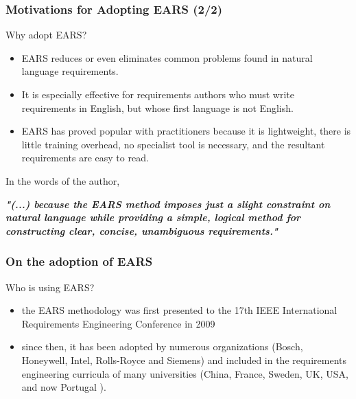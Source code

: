\documentclass[aspectratio=169]{beamer}
\begin{document}
%
\begin{frame}
  \frametitle{Motivations for Adopting EARS (2/2)}
  \begin{block}{Why adopt EARS?}
  \begin{itemize}
    \item EARS reduces or even eliminates common problems found in natural language requirements. 
    \item It is especially effective for requirements authors who must write requirements in English, but whose first language is not English. 
    \item EARS has proved popular with practitioners because it is lightweight, there is little training overhead, no specialist tool is necessary, and the resultant requirements are easy to read.
  \end{itemize}
  \end{block} 
  In the words of the author, \begin{alert}
  {{\it {\bf "(...) because the EARS method imposes just a slight constraint on natural language while providing a simple, logical method for constructing clear, concise, unambiguous requirements."}}}
  \end{alert}

\end{frame}
%
\begin{frame}
  \frametitle{On the adoption of EARS}
  \begin{block}{Who is using EARS?}
  \begin{itemize}
    \item the EARS methodology was first presented to the 17th IEEE International Requirements Engineering Conference in 2009
    \item since then, it has been adopted by numerous organizations (Bosch, Honeywell, Intel, Rolls-Royce and Siemens) and included in the requirements engineering curricula of many universities (China, France, Sweden, UK, USA, and now Portugal {\Large\smiley{}}).  
  \end{itemize}
  \end{block} 
\end{frame}
%
%
%
\end{document}
